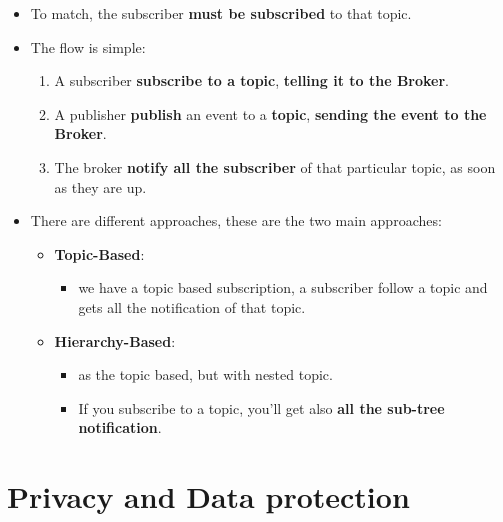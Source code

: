 \documentclass[9pt, letterpaper]{article}
\begin{document}
\begin{itemize}
	\item To match, the subscriber \textbf{must be subscribed} to that topic.
	\item The flow is simple:
	\begin{enumerate}
		\item A subscriber \textbf{subscribe to a topic}, \textbf{telling it to the Broker}.
		\item A publisher \textbf{publish} an event to a \textbf{topic}, \textbf{sending the event to the Broker}.
		\item The broker \textbf{notify all the subscriber} of that particular topic, as soon as they are up.
	\end{enumerate}
	\item There are different approaches, these are the two main approaches:
	\begin{itemize}
		\item \textbf{Topic-Based}:
		\begin{itemize}
		\item we have a topic based subscription, a subscriber follow a topic and gets all the notification of that topic.
		\end{itemize}
		\item \textbf{Hierarchy-Based}: 
		\begin{itemize}
			\item as the topic based, but with nested topic.
			\item If you subscribe to a topic, you'll get also \textbf{all the sub-tree notification}.
		\end{itemize}
	\end{itemize}
\end{itemize}

\newpage

\section{Privacy and Data protection}
\end{document}
